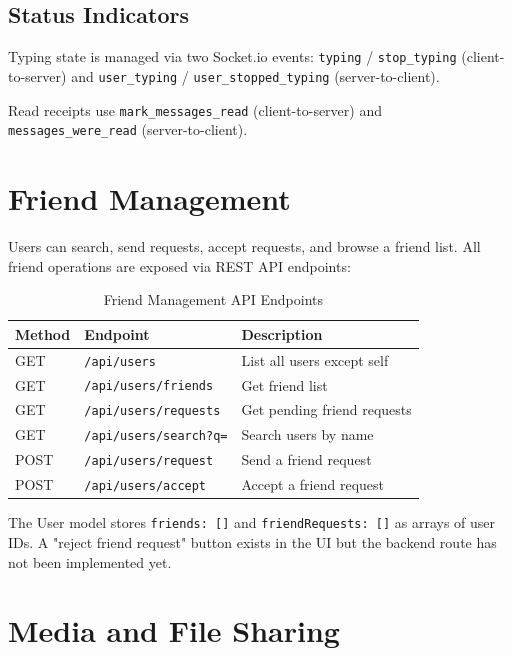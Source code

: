 \documentclass[12pt,a4paper]{article}
\newcommand{\code}[1]{\texttt{#1}}
\begin{document}
\subsection{Status Indicators}
\label{sec:status-indicators}

Typing state is managed via two Socket.io events:
\code{typing} / \code{stop\_typing} (client-to-server) and
\code{user\_typing} / \code{user\_stopped\_typing} (server-to-client).

Read receipts use \code{mark\_messages\_read} (client-to-server) and
\code{messages\_were\_read} (server-to-client).

\section{Friend Management}
\label{sec:friends}

Users can search, send requests, accept requests, and browse a friend list.
All friend operations are exposed via REST API endpoints:

\begin{table}[H]
    \centering
    \caption{Friend Management API Endpoints}
    \begin{tabular}{llp{7cm}}
        \toprule
        \textbf{Method} & \textbf{Endpoint}             & \textbf{Description} \\
        \midrule
        GET    & \code{/api/users}              & List all users except self \\
        GET    & \code{/api/users/friends}     & Get friend list \\
        GET    & \code{/api/users/requests}    & Get pending friend requests \\
        GET    & \code{/api/users/search?q=}   & Search users by name \\
        POST   & \code{/api/users/request}      & Send a friend request \\
        POST   & \code{/api/users/accept}       & Accept a friend request \\
        \bottomrule
    \end{tabular}
\end{table}

The User model stores \code{friends: []} and \code{friendRequests: []}
as arrays of user IDs. A "reject friend request" button exists in the UI
but the backend route has not been implemented yet.

\section{Media and File Sharing}
\label{sec:media}
\end{document}
